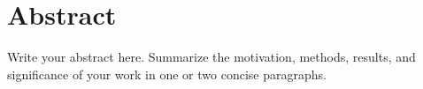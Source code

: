 
\chapter*{Abstract}

Write your abstract here. Summarize the motivation, methods, results, and
significance of your work in one or two concise paragraphs.
